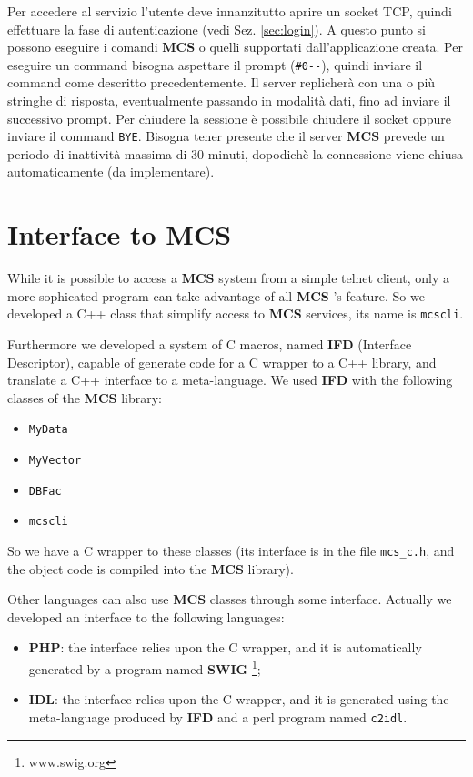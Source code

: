 \documentclass[12pt,titlepage]{book}
\newcommand{\mcs}{\textbf{MCS} }
\begin{document}
Per accedere al servizio l'utente deve innanzitutto aprire un socket
TCP, quindi effettuare la fase di autenticazione (vedi
Sez. \ref{sec:login}). A questo punto si possono eseguire i comandi
\mcs o quelli supportati dall'applicazione creata. Per eseguire un
command bisogna aspettare il prompt (\verb|#0--|), quindi inviare il
command come descritto precedentemente. Il server replicher\`a con una
o pi\`u stringhe di risposta, eventualmente passando in modalit\`a
dati, fino ad inviare il successivo prompt. Per chiudere la sessione
\`e possibile chiudere il socket oppure inviare il command
\verb|BYE|. Bisogna tener presente che il server \mcs prevede un
periodo di inattivit\`a massima di 30 minuti, dopodich\`e la
connessione viene chiusa automaticamente (da implementare).




\chapter{Interface to MCS}
While it is possible to access a \mcs system from a simple telnet client, only
a more sophicated program can take advantage of all \mcs's feature. So we
developed a C++ class that simplify access to \mcs services, its name is
\verb|mcscli|.

\noindent Furthermore we developed a system of C macros, named \textbf{IFD}
(Interface Descriptor), capable of generate code for a C wrapper to a C++
library, and translate a C++ interface to a meta-language. We used
\textbf{IFD} with the following classes of the \mcs library:
\begin{itemize}
\item \verb|MyData|
\item \verb|MyVector|
\item \verb|DBFac|
\item \verb|mcscli|
\end{itemize}
So we have a C wrapper to these classes (its interface is in the file
\verb|mcs_c.h|, and the object code is compiled into the \mcs library).

\noindent Other languages can also use \mcs classes through some
interface. Actually we developed an interface to the following languages:
\begin{itemize}
\item \textbf{PHP}: the interface relies upon the C wrapper, and it is
  automatically generated by a program named \textbf{SWIG}
  \footnote{www.swig.org};
\item \textbf{IDL}: the interface relies upon the C wrapper, and it is
  generated using the meta-language produced by \textbf{IFD} and a perl
  program named \verb|c2idl|.
\end{itemize}
\end{document}
